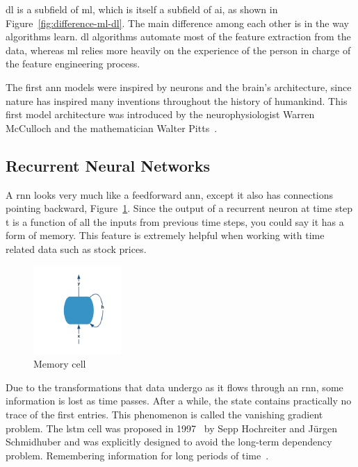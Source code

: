 \gls{dl} is a subfield of \gls{ml}, which is itself a subfield of \gls{ai}, as shown in Figure~\ref{fig:difference-ml-dl}. The main difference among each other is in the way algorithms learn. \gls{dl} algorithms automate most of the feature extraction from the data, whereas \gls{ml} relies more heavily on the experience of the person in charge of the feature engineering process.

The first \gls{ann} models were inspired by neurons and the brain's architecture, since nature has inspired many inventions throughout the history of humankind. This first model architecture was introduced by the neurophysiologist Warren McCulloch and the mathematician Walter Pitts~\cite{nnModelDefinition}.\newline

\subsection{Recurrent Neural Networks}

A \gls{rnn} looks very much like a feedforward \gls{ann}, except it also has connections pointing backward, Figure~\ref{fig:memory-cell}. Since the output of a recurrent neuron at time step t is a function of all the inputs from previous time steps, you could say it has a form of memory\cite{handsOnMachine}. This feature is extremely helpful when working with time related data such as stock prices.

\begin{figure}[H]
    \centering
    \caption{\label{fig:memory-cell} Memory cell}
    \includegraphics[width=0.30\textwidth]{figures/memory-cell.png}
\end{figure}

Due to the transformations that data undergo as it flows through an \gls{rnn}, some information is lost as time passes. After a while, the state contains practically no trace of the first entries. This phenomenon is called the vanishing gradient problem. The \gls{lstm} cell was proposed in 1997~\cite{lstm1997} by Sepp Hochreiter and Jürgen Schmidhuber and was explicitly designed to avoid the long-term dependency problem. Remembering information for long periods of time~\cite{understandLSTM}.

